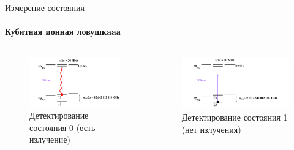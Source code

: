 \documentclass{beamer}
\begin{document}
    \begin{frame}{Измерение состояния}
    \framesubtitle{Кубитная ионная ловушкaaа}

    \begin{columns}

    \begin{column}{0.5\textwidth}

        \begin{figure}
            \centering
            \includegraphics[width=\textwidth]{media/detection1.png}
            \caption{Детектирование состояния 0 (есть излучение)}
        \end{figure}

    \end{column}

    \begin{column}{0.5\textwidth}

        \begin{figure}
            \centering
            \includegraphics[width=\textwidth]{media/detection2.png}
            \caption{Детектирование состояния 1 (нет излучения)}
        \end{figure}

    \end{column}

    \end{columns}

    \end{frame}
\end{document}
